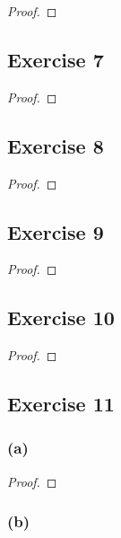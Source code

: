 \documentclass[14pt]{extarticle}
\begin{document}
\begin{proof}

\end{proof}

\subsection{Exercise 7}

\begin{proof}

\end{proof}

\subsection{Exercise 8}

\begin{proof}

\end{proof}

\subsection{Exercise 9}

\begin{proof}

\end{proof}

\subsection{Exercise 10}

\begin{proof}

\end{proof}

\subsection{Exercise 11}

\subsubsection{(a)}

\begin{proof}

\end{proof}

\subsubsection{(b)}
\end{document}
